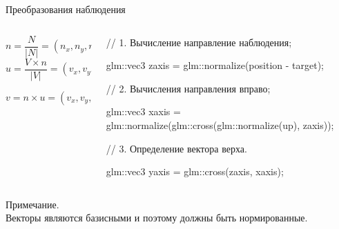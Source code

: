 \documentclass{beamer}
\begin{document}
	\begin{frame}{Преобразования наблюдения}

		\begin{columns}
			\begin{column}{0.4\textwidth}
				\[
					n = \frac{N}{|N|}	= (n_x, n_y, n_z)
				\]
				\[
					u = \frac{V \times n }{|V|} = (v_x,v_y,v_z)	
				\]
		
				\[
					v = n \times u = (v_x, v_y, v_z)	
				\]
		
			\end{column}
			\begin{column}{0.6\textwidth}
				// 1. Вычисление направление наблюдения;

				glm::vec3 zaxis = glm::normalize(position - target);
				
				// 2. Вычисления направления вправо;
				
				glm::vec3 xaxis = glm::normalize(glm::cross(glm::normalize(up), zaxis));
				
				// 3. Определение вектора верха.
				
				glm::vec3 yaxis = glm::cross(zaxis, xaxis);
			\end{column}
		\end{columns}

		Примечание. \\
		Векторы являются базисными и поэтому должны быть нормированные.
		
	\end{frame}
\end{document}

